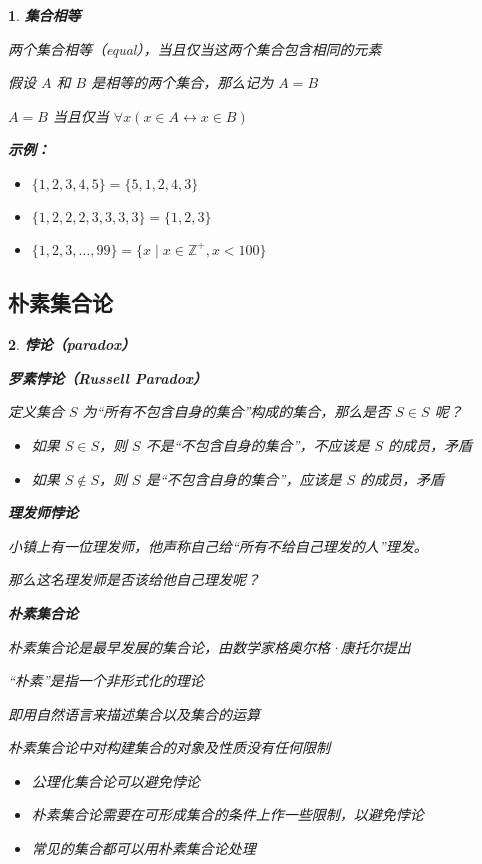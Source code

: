 \documentclass[UTF8]{report}
\theoremstyle{MyLineTheoremStyle} %
\theoremstyle{MyBlockTheoremStyle} %
\theoremstyle{MySubsubsectionStyle} %
\newtheorem{definition}{}
\begin{document}
\begin{definition}
    \textbf{集合相等}\par
    两个集合相等（equal），当且仅当这两个集合包含相同的元素\par
    假设 $A$ 和 $B$ 是相等的两个集合，那么记为 $A = B$\par
    $A = B$ 当且仅当 $\forall x (x \in A \leftrightarrow x \in B)$\par

    \textbf{示例：}\par
    \begin{itemize}
        \item $\{1, 2, 3, 4, 5\} = \{5, 1, 2, 4, 3\}$
        \item $\{1, 2, 2, 2, 3, 3, 3, 3\} = \{1, 2, 3\}$
        \item $\{1, 2, 3, \ldots, 99\} = \{x \mid x \in \mathbb{Z}^+, x < 100\}$
    \end{itemize}
\end{definition}

\subsection{朴素集合论}

\begin{definition}
    \textbf{悖论（paradox）}\par

    \textbf{罗素悖论（Russell Paradox）}\par
    定义集合 $S$ 为“所有不包含自身的集合”构成的集合，那么是否 $S \in S$ 呢？\par
    \begin{itemize}
        \item 如果 $S \in S$，则 $S$ 不是“不包含自身的集合”，不应该是 $S$ 的成员，矛盾
        \item 如果 $S \notin S$，则 $S$ 是“不包含自身的集合”，应该是 $S$ 的成员，矛盾
    \end{itemize}

    \textbf{理发师悖论}\par
    小镇上有一位理发师，他声称自己给“所有不给自己理发的人”理发。\par
    那么这名理发师是否该给他自己理发呢？\par

    \textbf{朴素集合论}\par
    朴素集合论是最早发展的集合论，由数学家格奥尔格·康托尔提出\par
    “朴素”是指一个非形式化的理论\par
    即用自然语言来描述集合以及集合的运算\par
    朴素集合论中对构建集合的对象及性质没有任何限制\par
    \begin{itemize}
        \item 公理化集合论可以避免悖论
        \item 朴素集合论需要在可形成集合的条件上作一些限制，以避免悖论
        \item 常见的集合都可以用朴素集合论处理
    \end{itemize}
\end{definition}
\end{document}
